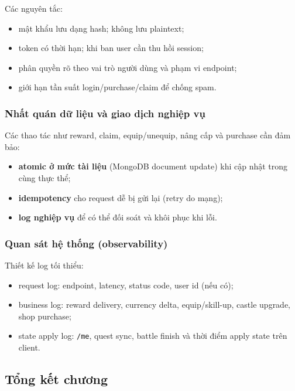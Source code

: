 Các nguyên tắc:
\begin{itemize}
    \item mật khẩu lưu dạng hash; không lưu plaintext;
    \item token có thời hạn; khi ban user cần thu hồi session;
    \item phân quyền rõ theo vai trò người dùng và phạm vi endpoint;
    \item giới hạn tần suất login/\allowbreak purchase/\allowbreak claim để chống spam.
\end{itemize}

\subsubsection{Nhất quán dữ liệu và giao dịch nghiệp vụ}
\label{subsubsec:design-consistency}

Các thao tác như reward, claim, equip/\allowbreak unequip, nâng cấp và purchase cần đảm bảo:
\begin{itemize}
    \item \textbf{atomic ở mức tài liệu} (MongoDB document update) khi cập nhật trong cùng thực thể;
    \item \textbf{idempotency} cho request dễ bị gửi lại (retry do mạng);
    \item \textbf{log nghiệp vụ} để có thể đối soát và khôi phục khi lỗi.
\end{itemize}

\subsubsection{Quan sát hệ thống (observability)}
\label{subsubsec:design-observability}

Thiết kế log tối thiểu:
\begin{itemize}
    \item request log: endpoint, latency, status code, user id (nếu có);
    \item business log: reward delivery, currency delta, equip/\allowbreak skill-up, castle upgrade, shop purchase;
    \item state apply log: \texttt{/me}, quest sync, battle finish và thời điểm apply state trên client.
\end{itemize}

\subsection{Tổng kết chương}
\label{subsec:design-summary}

